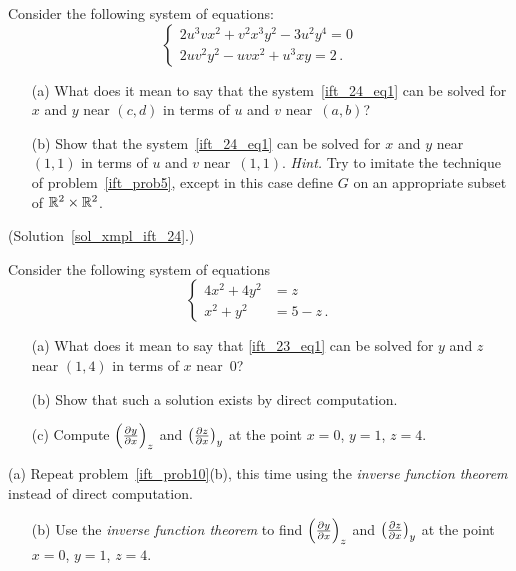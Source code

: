 \begin{exer}\label{xmpl_ift_24} Consider the following system of equations:
  \begin{equation}\label{ift_24_eq1}
    \begin{cases}
            2u^3vx^2 + v^2x^3y^2 - 3u^2y^4 = 0 \\
            2uv^2y^2 - uvx^2 + u^3xy = 2 \,.
    \end{cases}
  \end{equation}
 \begin{enumerate}
   \item[(a)]  What does it mean to say that the system~\eqref{ift_24_eq1} can be solved for $x$
and $y$ near $(c,d)$ in terms of $u$ and $v$ near~$(a,b)$?
   \item[(b)]  Show that the system~\eqref{ift_24_eq1} can be solved for $x$ and $y$ near $(1,1)$
in terms of $u$ and $v$ near~$(1,1)$. \emph{Hint.} Try to imitate the technique of
problem~\ref{ift_prob5}, except in this case define $G$ on an appropriate subset of $\mathbb{R}^2
\times \mathbb{R}^2$.
 \end{enumerate}
 (Solution~\ref{sol_xmpl_ift_24}.)
\end{exer}

\begin{prob}\label{ift_prob10}  Consider the following system of equations
   \begin{equation}\label{ift_23_eq1}
     \begin{cases}
            4x^2 + 4y^2 &= z \\
             x^2 + y^2 &= 5 - z \,.
     \end{cases}
   \end{equation}
 \begin{enumerate}
  \item[(a)] What does it mean to say that \eqref{ift_23_eq1} can be solved for  $y$ and $z$ near
$(1,4)$ in terms of $x$ near~0?
  \item[(b)] Show that such a solution exists by direct computation.
  \item[(c)] Compute $\left(\frac{\partial y}{\partial x}\right)_{z}$ and $\left(\frac{\partial z}{\partial x}\right)_{y}$ at the point $x = 0$, $y = 1$, $z = 4$.
 \end{enumerate}
\end{prob}

\begin{prob}\label{ift_prob11}(a) Repeat problem~\ref{ift_prob10}(b), this time using the
\emph{inverse function theorem} instead of direct computation.
  \begin{enumerate}
   \item[(b)] Use the \emph{inverse function theorem} to find $\left(\frac{\partial y}{\partial x}\right)_{z}$ and $\left(\frac{\partial z}{\partial x}\right)_{y}$ at the
point $x = 0$, $y = 1$, $z = 4$.
  \end{enumerate}
\end{prob}

